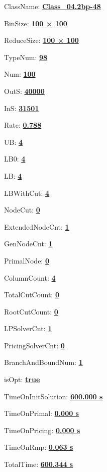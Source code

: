\documentclass[11pt]{article}
\begin{document}
\pagestyle{empty}


ClassName: \underline{\textbf{Class_04.2bp-48}}
\par
BinSize: \underline{\textbf{100 × 100}}
\par
ReduceSize: \underline{\textbf{100 × 100}}
\par
TypeNum: \underline{\textbf{98}}
\par
Num: \underline{\textbf{100}}
\par
OutS: \underline{\textbf{40000}}
\par
InS: \underline{\textbf{31501}}
\par
Rate: \underline{\textbf{0.788}}
\par
UB: \underline{\textbf{4}}
\par
LB0: \underline{\textbf{4}}
\par
LB: \underline{\textbf{4}}
\par
LBWithCut: \underline{\textbf{4}}
\par
NodeCut: \underline{\textbf{0}}
\par
ExtendedNodeCnt: \underline{\textbf{1}}
\par
GenNodeCnt: \underline{\textbf{1}}
\par
PrimalNode: \underline{\textbf{0}}
\par
ColumnCount: \underline{\textbf{4}}
\par
TotalCutCount: \underline{\textbf{0}}
\par
RootCutCount: \underline{\textbf{0}}
\par
LPSolverCnt: \underline{\textbf{1}}
\par
PricingSolverCnt: \underline{\textbf{0}}
\par
BranchAndBoundNum: \underline{\textbf{1}}
\par
isOpt: \underline{\textbf{true}}
\par
TimeOnInitSolution: \underline{\textbf{600.000 s}}
\par
TimeOnPrimal: \underline{\textbf{0.000 s}}
\par
TimeOnPricing: \underline{\textbf{0.000 s}}
\par
TimeOnRmp: \underline{\textbf{0.063 s}}
\par
TotalTime: \underline{\textbf{600.344 s}}
\par
\newpage
\end{document}
